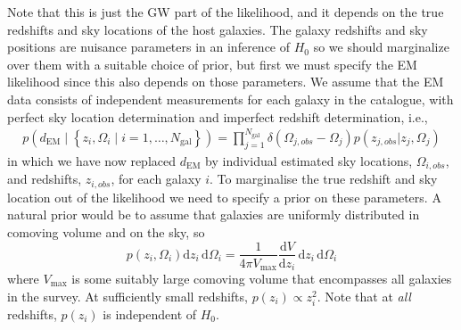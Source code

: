 \documentclass[modern]{article}
\newcommand{\dd}{\mathrm{d}}
\newcommand{\dEM}{d_{\mathrm{EM}}}
\newcommand{\diff}[2]{\frac{\dd #1}{\dd #2}}
\newcommand{\Ngal}{N_{\mathrm{gal}}}
\begin{document}
Note that this is just the GW part of the likelihood, and it depends on the true redshifts and sky locations of the host galaxies. The galaxy redshifts and sky positions are nuisance parameters in an inference of $H_0$ so we should marginalize over them with a suitable choice of
prior, but first we must specify the EM likelihood since this also depends on those parameters. We assume that the EM data consists of independent measurements for each galaxy in the catalogue, with perfect sky location determination and imperfect redshift determination, i.e.,
\begin{multline}
p\left( \dEM \mid \left\{ z_i, \Omega_i \mid i = 1, \ldots, \Ngal \right\} \right) = \prod_{j=1}^{\Ngal} \delta(\Omega_{j,obs}-\Omega_j) p(z_{j,obs} | z_j, \Omega_j)
\end{multline}
in which we have now replaced $\dEM$ by individual estimated sky locations, $\Omega_{i,obs}$, and redshifts, $z_{i,obs}$, for each galaxy $i$. To marginalise the true redshift and sky location out of the likelihood we need to specify a prior on these parameters. A natural prior would be to assume that galaxies are uniformly distributed in comoving volume and on the sky, so
%
\begin{equation}
    p\left( z_i, \Omega_i \right) \dd z_i \, \dd \Omega_i = \frac{1}{4\pi V_\mathrm{max}} \diff{V}{z_i} \, \dd z_i \, \dd \Omega_i
\end{equation}
%
where $V_\mathrm{max}$ is some suitably large comoving volume that encompasses
all galaxies in the survey.  At sufficiently small redshifts, $p\left( z_i
\right) \propto z_i^2$.  Note that at \emph{all} redshifts, $p\left( z_i
\right)$ is independent of $H_0$.
\end{document}
